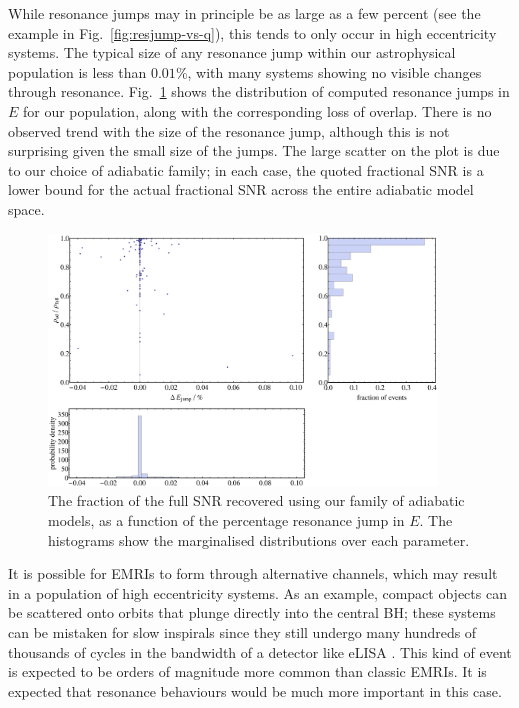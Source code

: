 \documentclass[aps,prd,amsfonts,amssymb,amsmath,nofootinbib,showpacs,superscriptaddress,twocolumn]{revtex4}
\newcommand{\figref}[1]{Fig.\ \ref{fig:#1}}
\newcommand{\Figref}[1]{Fig.\ \ref{fig:#1}}
\begin{document}
While resonance jumps may in principle be as large as a few percent (see the example in \figref{resjump-vs-q}), this tends to only occur in high eccentricity systems. The typical size of any resonance jump within our astrophysical population is less than $0.01\%$, with many systems showing no visible changes through resonance. \Figref{pop-SNR-vs-jump} shows the distribution of computed resonance jumps in $E$ for our population, along with the corresponding loss of overlap. There is no observed trend with the size of the resonance jump, although this is not surprising given the small size of the jumps. The large scatter on the plot is due to our choice of adiabatic family; in each case, the quoted fractional SNR is a lower bound for the actual fractional SNR across the entire adiabatic model space.

\begin{figure}[htbp]
\centering
\includegraphics[width=0.92\textwidth]{Fig_pop_SNR_vs_jump}
\caption{\label{fig:pop-SNR-vs-jump}The fraction of the full SNR recovered using our family of adiabatic models, as a function of the percentage resonance jump in $E$. The histograms show the marginalised distributions over each parameter.}
\end{figure}

It is possible for EMRIs to form through alternative channels, which may result in a population of high eccentricity systems. As an example, compact objects can be scattered onto orbits that plunge directly into the central BH; these systems can be mistaken for slow inspirals since they still undergo many hundreds of thousands of cycles in the bandwidth of a detector like eLISA \cite{Amaro-Seoane2013}. This kind of event is expected to be orders of magnitude more common than classic EMRIs. It is expected that resonance behaviours would be much more important in this case.
\end{document}
